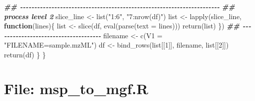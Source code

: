 \documentclass[
]{article}
\newenvironment{Shaded}{\begin{snugshade}}{\end{snugshade}}
\newcommand{\AttributeTok}[1]{\textcolor[rgb]{0.77,0.63,0.00}{#1}}
\newcommand{\ControlFlowTok}[1]{\textcolor[rgb]{0.13,0.29,0.53}{\textbf{#1}}}
\newcommand{\DecValTok}[1]{\textcolor[rgb]{0.00,0.00,0.81}{#1}}
\newcommand{\DocumentationTok}[1]{\textcolor[rgb]{0.56,0.35,0.01}{\textbf{\textit{#1}}}}
\newcommand{\FunctionTok}[1]{\textcolor[rgb]{0.00,0.00,0.00}{#1}}
\newcommand{\NormalTok}[1]{#1}
\newcommand{\OtherTok}[1]{\textcolor[rgb]{0.56,0.35,0.01}{#1}}
\newcommand{\StringTok}[1]{\textcolor[rgb]{0.31,0.60,0.02}{#1}}
\begin{document}
\begin{Shaded}
\begin{Highlighting}[]
      \DocumentationTok{\#\# {-}{-}{-}{-}{-}{-}{-}{-}{-}{-}{-}{-}{-}{-}{-}{-}{-}{-}{-}{-}{-}{-}{-}{-}{-}{-}{-}{-}{-}{-}{-}{-}{-}{-}{-}{-}{-}{-}{-}{-}{-}{-}{-}{-}{-}{-}{-}{-}{-}{-}{-}{-}{-}{-}{-}{-}{-}{-}{-}{-}{-}{-}{-}{-}{-}{-}{-}{-}{-}{-} }
      \DocumentationTok{\#\# process level 2}
\NormalTok{      slice\_line }\OtherTok{\textless{}{-}} \FunctionTok{list}\NormalTok{(}\StringTok{"1:6"}\NormalTok{, }\StringTok{"7:nrow(df)"}\NormalTok{)}
\NormalTok{      list }\OtherTok{\textless{}{-}} \FunctionTok{lapply}\NormalTok{(slice\_line, }\ControlFlowTok{function}\NormalTok{(lines)\{}
\NormalTok{                       list }\OtherTok{\textless{}{-}} \FunctionTok{slice}\NormalTok{(df, }\FunctionTok{eval}\NormalTok{(}\FunctionTok{parse}\NormalTok{(}\AttributeTok{text =}\NormalTok{ lines)))}
                       \FunctionTok{return}\NormalTok{(list)}
\NormalTok{           \})}
      \DocumentationTok{\#\# {-}{-}{-}{-}{-}{-}{-}{-}{-}{-}{-}{-}{-}{-}{-}{-}{-}{-}{-}{-}{-}{-}{-}{-}{-}{-}{-}{-}{-}{-}{-}{-}{-}{-}{-}{-}{-} }
\NormalTok{      filename }\OtherTok{\textless{}{-}} \FunctionTok{c}\NormalTok{(}\AttributeTok{V1 =} \StringTok{"FILENAME=sample.mzML"}\NormalTok{)}
\NormalTok{      df }\OtherTok{\textless{}{-}} \FunctionTok{bind\_rows}\NormalTok{(list[[}\DecValTok{1}\NormalTok{]], filename, list[[}\DecValTok{2}\NormalTok{]])}
      \FunctionTok{return}\NormalTok{(df)}
\NormalTok{    \}}
\NormalTok{  \}}
\end{Highlighting}
\end{Shaded}

\hypertarget{file-msp_to_mgf.r}{%
\section{File: msp\_to\_mgf.R}\label{file-msp_to_mgf.r}}
\end{document}
